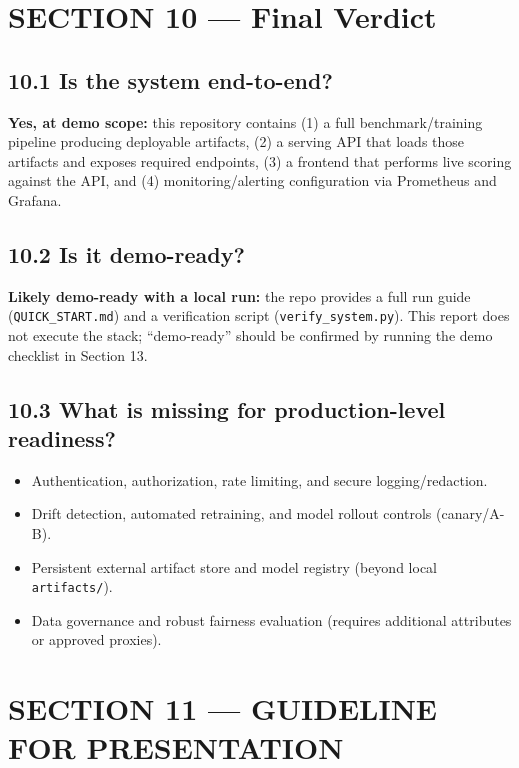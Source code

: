\documentclass[11pt]{article}
\newcommand{\code}[1]{\texttt{#1}}
\begin{document}
\section*{SECTION 10 — Final Verdict}

\subsection*{10.1 Is the system end-to-end?}
\textbf{Yes, at demo scope:} this repository contains (1) a full benchmark/training pipeline producing deployable artifacts, (2) a serving API that loads those artifacts and exposes required endpoints, (3) a frontend that performs live scoring against the API, and (4) monitoring/alerting configuration via Prometheus and Grafana.

\subsection*{10.2 Is it demo-ready?}
\textbf{Likely demo-ready with a local run:} the repo provides a full run guide (\code{QUICK\_START.md}) and a verification script (\code{verify\_system.py}). This report does not execute the stack; ``demo-ready'' should be confirmed by running the demo checklist in Section 13.

\subsection*{10.3 What is missing for production-level readiness?}
\begin{itemize}
  \item Authentication, authorization, rate limiting, and secure logging/redaction.
  \item Drift detection, automated retraining, and model rollout controls (canary/A-B).
  \item Persistent external artifact store and model registry (beyond local \code{artifacts/}).
  \item Data governance and robust fairness evaluation (requires additional attributes or approved proxies).
\end{itemize}

\section*{SECTION 11 — GUIDELINE FOR PRESENTATION}
\end{document}
